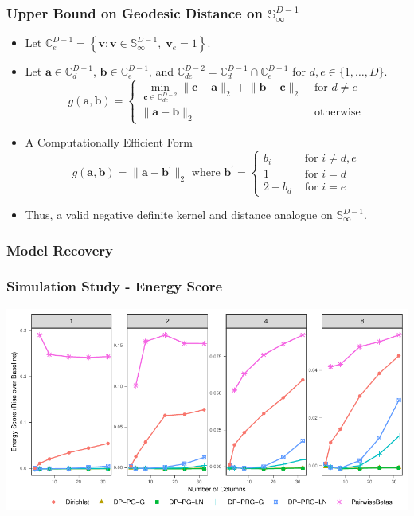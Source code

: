 \documentclass[aspectratio=169,10pt]{beamer}
\newlength{\frametextheight}
\begin{document}
\begin{frame}
    \frametitle{Upper Bound on Geodesic Distance on $\mathbb{S}_{\infty}^{D-1}$}
    \begin{itemize}
        \item Let $\mathbb{C}_e^{D-1} = \left\lbrace\bm{v} : \bm{v} \in 
            \mathbb{S}_{\infty}^{D-1},\;\bm{v}_e = 1\right\rbrace$.
        \item Let $\bm{a}\in \mathbb{C}_d^{D-1}$, $\bm{b}\in\mathbb{C}_e^{D-1}$, and
            $\mathbb{C}_{de}^{D-2} = \mathbb{C}_d^{D-1}\cap \mathbb{C}_e^{D-1}$
            for $d,e\in \lbrace 1,\ldots,D\rbrace$.
            \[
            g(\bm{a},\bm{b}) = \begin{cases}
                \min\limits_{\bm{c}\in\mathbb{C}_{de}^{D-2}}\lVert \bm{c} - \bm{a}\rVert_2 + 
                    \lVert \bm{b} - \bm{c}\rVert_2 &\text{ for }d\neq e\\
            \lVert \bm{a} - \bm{b}\rVert_2 &\text{ otherwise}
            \end{cases}
            \]
        \item A Computationally Efficient Form
        \[
            g(\bm{a},\bm{b}) = \lVert \bm{a} - \bm{b}^{\prime}\lVert_2 
            \text{ where }\bm{b}^{\prime} = \begin{cases}
                b_i &\text{ for }i\neq d,e\\
                1 &\text{ for }i = d\\
                2 - b_d &\text{ for }i = e
                \end{cases}
        \]
        \item Thus, a valid negative definite kernel and distance analogue on $\mathbb{S}_{\infty}^{D-1}$.
    \end{itemize}    
\end{frame} %

\subsubsection{Model Recovery}

\begin{frame}
    \label{pgpareto:simstudy}
  \frametitle{Simulation Study - Energy Score}
  \begin{center}
    \includegraphics[height=0.9\frametextheight]{./ch1/images/sim_es_rise}
  \end{center}
  \hyperlink{pgpareto:simstudydetails}{}
\end{frame} %
\end{document}
